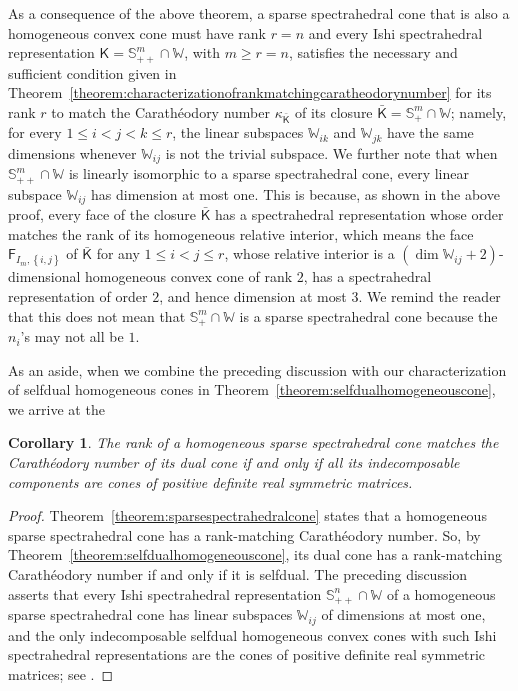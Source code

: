 \documentclass[oneside]{amsart}
\theoremstyle{plain}
\newtheorem{corollary}[theorem]{Corollary}
\theoremstyle{definition}
\theoremstyle{remark}
\numberwithin{equation}{section}
\begin{document}
As a consequence of the above theorem, a sparse spectrahedral cone that is
also a homogeneous convex cone must have rank $r = n$ and every Ishi
spectrahedral representation $\mathsf{K} = \mathbb{S}^{m}_{++} \cap
\mathbb{W}$, with $m \geq r = n$, satisfies the necessary and sufficient
condition given in
Theorem~\ref{theorem:characterizationofrankmatchingcaratheodorynumber} for
its rank $r$ to match the Carath\'eodory number $\kappa_{\bar{\mathsf{K}}}$
of its closure $\bar{\mathsf{K}} = \mathbb{S}^{m}_{+} \cap \mathbb{W}$;
namely, for every $1 \leq i < j < k \leq r$, the linear subspaces
$\mathbb{W}_{ik}$ and $\mathbb{W}_{jk}$ have the same dimensions whenever
$\mathbb{W}_{ij}$ is not the trivial subspace. We further note that when
$\mathbb{S}^{m}_{++} \cap \mathbb{W}$ is linearly isomorphic to a sparse
spectrahedral cone, every linear subspace $\mathbb{W}_{ij}$ has dimension
at most one. This is because, as shown in the above proof, every face of
the closure $\bar{\mathsf{K}}$ has a spectrahedral representation whose
order matches the rank of its homogeneous relative interior, which means
the face $\mathsf{F}_{I_{m},\left\{i,j\right\}}$ of $\bar{\mathsf{K}}$ for
any $1 \leq i < j \leq r$, whose relative interior is a $(\dim
\mathbb{W}_{ij} + 2)$-dimensional homogeneous convex cone of rank $2$, has
a spectrahedral representation of order $2$, and hence dimension at most
$3$. We remind the reader that this does not mean that $\mathbb{S}^{m}_{+}
\cap \mathbb{W}$ is a sparse spectrahedral cone because the $n_{i}$'s may
not all be $1$.

As an aside, when we combine the preceding discussion with our
characterization of selfdual homogeneous cones in
Theorem~\ref{theorem:selfdualhomogeneouscone}, we arrive at the
\begin{corollary}\label{theorem:dualsparsespectrahedralcone}
The rank of a homogeneous sparse spectrahedral cone matches the
Carath\'eodory number of its dual cone if and only if all its
indecomposable components are cones of positive definite real symmetric
matrices.
\end{corollary}
\begin{proof}
Theorem~\ref{theorem:sparsespectrahedralcone} states that a homogeneous
sparse spectrahedral cone has a rank-matching Carath\'eodory number. So, by
Theorem~\ref{theorem:selfdualhomogeneouscone}, its dual cone has a
rank-matching Carath\'eodory number if and only if it is selfdual. The
preceding discussion asserts that every Ishi spectrahedral representation
$\mathbb{S}^{n}_{++} \cap \mathbb{W}$ of a homogeneous sparse spectrahedral
cone has linear subspaces $\mathbb{W}_{ij}$ of dimensions at most one, and
the only indecomposable selfdual homogeneous convex cones with such Ishi
spectrahedral representations are the cones of positive definite real
symmetric matrices; see \cite[\S{II}.2]{Vin65}.
\end{proof}
\end{document}
